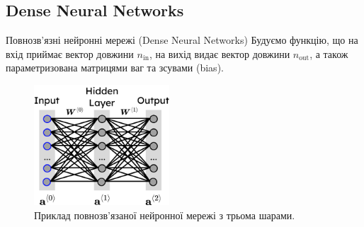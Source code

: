\documentclass[xcolor={usenames,dvipsnames}]{beamer}
\begin{document}
    \subsection{Dense Neural Networks}
    \begin{frame}{Повнозв'язні нейронні мережі (Dense Neural Networks)}
        Будуємо функцію, що на вхід приймає вектор довжини $n_{\text{in}}$, на вихід видає вектор довжини $n_{\text{out}}$, а також параметризована матрицями ваг та зсувами (bias).
        \begin{figure}
            \centering
            \includegraphics[width=0.45\textwidth]{images/flat_network.png}
            \caption{Приклад повнозв'язаної нейронної мережі з трьома шарами.}
        \end{figure}
    \end{frame}
\end{document}
